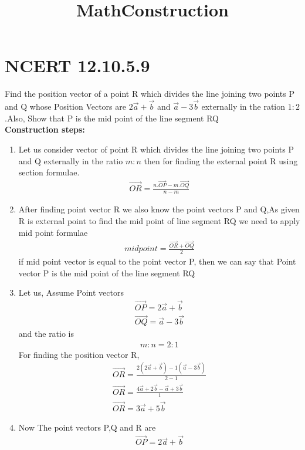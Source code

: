 \documentclass{article}
\title{MathConstruction}
\begin{document}
\section{NCERT 12.10.5.9}

Find the position vector of a point R which divides the line joining two points P and Q whose Position Vectors are $2\vec{a}+\vec{b}$ and $\vec{a}-3\vec{b}$ externally in the ration $1:2$.Also, Show that P is the mid point of the line segment RQ \\
\textbf{Construction steps:}
\begin{enumerate}
    \item Let us consider vector of point R which divides the line joining two points P and Q externally in the ratio $m:n$ then for finding the external point R using section formulae.\\
    \begin{align}
        \Vec{OR}=\frac{n.\Vec{OP}-m.\Vec{OQ}}{n-m}
    \end{align}
    \item After finding point vector R we also know the point vectors P and Q,As given R is external point to find the mid point of line segment RQ we need to apply mid point formulae \\
    \begin{align}
        mid point =\frac{\Vec{OR}+\Vec{OQ}}{2}
    \end{align}
    if mid point vector is equal to the point vector P, then we can say that Point vector P is the mid point of the line segment RQ
    \item Let us, Assume Point vectors 
    \begin{align}
        \vec{OP}=2\vec{a}+\vec{b}\\
        \vec{OQ}=\vec{a}-3\vec{b}
    \end{align}
    and the ratio is 
    \begin{align}
        m:n=2:1
    \end{align}
    For finding the position vector R,
    \begin{align}
        \Vec{OR}=\frac{2(2\vec{a}+\vec{b})-1(\vec{a}-3\vec{b})}{2-1}\\
        \Vec{OR}=\frac{4\Vec{a}+2\Vec{b}-\Vec{a}+3\Vec{b}}{1}\\
        \Vec{OR}=3\Vec{a}+5\Vec{b}
    \end{align}
    \item Now The point vectors P,Q and R are
    \begin{align}
        \vec{OP}=2\vec{a}+\vec{b}\\

\end{align}
\end{enumerate}
\end{document}
